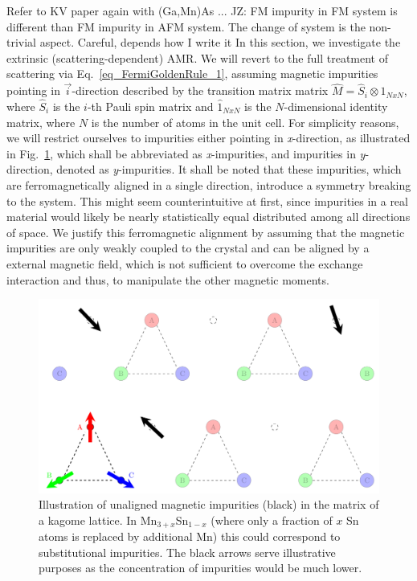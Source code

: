 \documentclass[prb,showpacs,amsmath,amssymb,superscriptaddress,twocolumn,floatfix]{revtex4-1}
\begin{document}
{\color{red}  Refer to KV paper again with (Ga,Mn)As ... JZ: FM impurity in FM system is different than FM impurity in AFM system. The change of system is the non-trivial aspect. Careful, depends how I write it }
In this section, we investigate the extrinsic (scattering-dependent) AMR. We will revert to the full treatment of scattering via Eq.~\ref{eq_FermiGoldenRule_1}, assuming magnetic impurities pointing in $\vec{i}$-direction described by the transition matrix matrix $\hat{M} = \hat{S}_i \otimes \hat{1}_{NxN}$, where $\hat{S}_i$ is the $i$-th Pauli spin matrix and $\hat{1}_{NxN}$ is the $N$-dimensional identity matrix, where $N$ is the number of atoms in the unit cell. For simplicity reasons, we will restrict ourselves to impurities either pointing in \textit{x}-direction, as illustrated in Fig.~\ref{fig:kagome21}, which shall be abbreviated as \textit{x}-impurities, and impurities in \textit{y}-direction, denoted as \textit{y}-impurities. It shall be noted that these impurities, which are ferromagnetically aligned in a single direction, introduce a symmetry breaking to the system. This might seem counterintuitive at first, since impurities in a real material would likely be nearly statistically equal distributed among all directions of space. {\color{red} We justify} this ferromagnetic alignment by assuming that the magnetic impurities are only weakly coupled to the crystal and can be aligned by a external magnetic field, which is not sufficient to overcome the exchange interaction and thus, to manipulate the other magnetic moments.

\begin{figure}
	\centering
	\includegraphics[width=\linewidth]{img/Kagome-impurity_v2}
	\caption{Illustration of unaligned magnetic impurities (black) in the matrix of a kagome lattice. In Mn$_{3+x}$Sn$_{1-x}$ (where only a fraction of $x$ Sn atoms is replaced by additional Mn) this could correspond to substitutional impurities. {\color{blue} The black arrows serve illustrative purposes as the concentration of impurities would be much lower.}
	}
	\label{fig:kagome21}
\end{figure}
\end{document}
